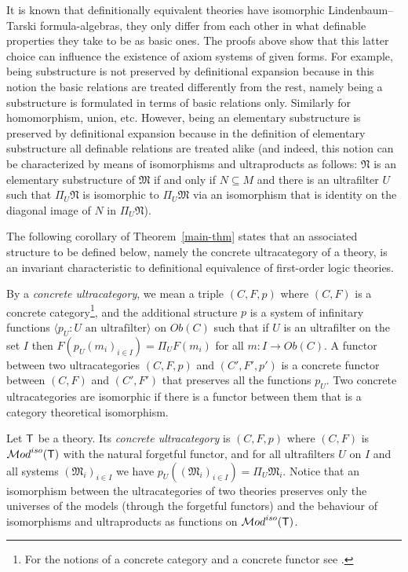\documentclass[12pt,leqno]{article}
\newcommand{\Mm}{\mbox{$\mathfrak M$}}
\newcommand{\Nn}{\mbox{$\mathfrak N$}}
\newcommand{\T}{\mbox{\sf T}}
\newcommand{\Cat}{\mbox{$\mathcal Mod$}}
\begin{document}
It is known that definitionally equivalent theories have isomorphic Linden\-baum--Tarski formula-algebras, they only differ from each other in what definable properties they take to be as basic ones. The proofs above show that this latter choice can influence the existence of axiom systems of given forms.
For example, being substructure is not preserved by definitional expansion because in this notion the basic relations are treated differently from the rest, namely being a substructure is formulated in terms of basic relations only. Similarly for homomorphism, union, etc. However, being an elementary substructure is preserved by definitional expansion because in the definition of elementary substructure all definable relations are treated alike (and indeed, this notion can be characterized by means of isomorphisms and ultraproducts as follows: $\Nn$ is an elementary substructure of $\Mm$ if and only if $N\subseteq M$ and there is an ultrafilter $U$ such that $\Pi_U\Nn$ is isomorphic to $\Pi_U\Mm$ via an isomorphism that is identity on the diagonal image of $N$ in $\Pi_U\Nn$).  %
\bigskip

The following corollary of Theorem~\ref{main-thm} states that an associated structure to be
defined below, namely the concrete ultracategory of a theory, is an
invariant characteristic to definitional equivalence of first-order
logic theories.

By a \emph{concrete ultracategory}, we mean a triple  $(C,F,p)$ where 
$(C,F)$ is a concrete category\footnote{For the notions of a concrete category and a concrete
functor see \cite[Chap.5]{AHS}.},
and the additional structure $p$ is a system of infinitary functions $\langle p_U : U \mbox{ an
ultrafilter}\rangle$ on $Ob(C)$ such that if $U$ is an ultrafilter on the set $I$
then $F(p_U(m_i)_{i\in I})=\Pi_UF(m_i)$ for all $m:I\to Ob(C)$.
A functor between two ultracategories $(C,F,p)$ and $(C',F',p')$ is a concrete functor between $(C,F)$ and $(C',F')$
that preserves all the functions $p_U$.  Two concrete ultracategories
are isomorphic if there is a functor between them that is a category
theoretical isomorphism. 

Let $\T$ be a theory. Its \emph{concrete ultracategory} is $(C,F,p)$
where $(C,F)$ is $\Cat^{iso}(\T)$ with the natural forgetful
functor, and for all ultrafilters $U$ on $I$ and all systems $(\Mm_i)_{i\in I}$ we have
$p_U((\Mm_i)_{i\in I})=\Pi_U\Mm_i$. Notice that an isomorphism between the ultracategories of two theories preserves only the universes of the models (through the forgetful functors) and the behaviour of isomorphisms and ultraproducts as functions on $\Cat^{iso}(\T)$.
\end{document}
